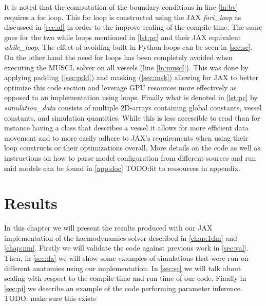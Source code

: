 \documentclass[a4paper, oneside]{discothesis}
\begin{document}
						It is noted that the computation of the boundary conditions in line \ref{ln:bv} requires a for loop.
						This for loop is constructed using the JAX \emph{fori\_loop} as discussed in \autoref{sec:al} in order to the improve scaling of the compile time.
						The same goes for the two while loops mentioned in \autoref{lst:pc} and their JAX equivalent \emph{while\_loop}.
						The effect of avoiding built-in Python loops can be seen in \autoref{sec:sc}.
						On the other hand the need for loops has been completely avoided when executing the MUSCL solver on all vessels (line \ref{ln:muscl}).
						This was done by applying padding (\autoref{sec:pdd}) and masking (\autoref{sec:msk}) allowing for JAX to better optimize this code section and leverage GPU resources more effectively as opposed to an implementation using loops.
						Finally what is denoted in \autoref{lst:pc} by \emph{simulation\_data} consists of multiple 2D-arrays containing global constants, vessel constants, and simulation quantities.
						While this is less accessible to read than for instance having a class that describes a vessel it allows for more efficient data movement and to more easily adhere to JAX's requirements when using their loop constructs or their optimizations overall.
						More details on the code as well as instructions on how to parse model configuration from different sources and run said models can be found in \autoref{app:doc} TODO:fit to ressources in appendix.



						\chapter{Results} \label{chap:resl}
						In this chapter we will present the results produced with our JAX implementation of the haemodynamics solver described in \autoref{chap:1dm} and \autoref{chap:nm}. 
						Firstly we will validate the code against previous work in \autoref{sec:val}.
						Then, in \autoref{sec:da} we will show some examples of simulations that were run on different anatomies using our implementation.
						In \autoref{sec:sc} we will talk about scaling with respect to the compile time and run time of our code.
						Finally in \autoref{sec:pi} we describe an example of the code performing parameter inference. TODO: make sure this exists
\end{document}
